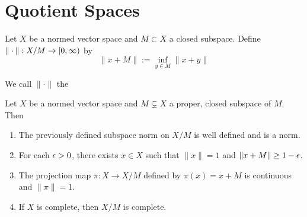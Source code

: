 \documentclass{book}
\begin{document}
	
	
	
	
	
	
	
	
	
	
	
	
	
	
	
	
	
	
	
	
	
	\newpage
	\section{Quotient Spaces}	
	
	\begin{defn} \ld{}
		Let $X$ be a normed vector space and $M \subset X$ a closed subspace. Define $\|\cdot\|:X/M \rightarrow [0,\infty)$ by $$\|x+M\| := \inf_{y \in M}\|x+y\|$$
		
		We call $\|\cdot\|$ the 
	\end{defn}
	
	\begin{ex} \lex{}
		Let $X$ be a normed vector space and $M \subsetneq X$ a proper, closed subspace of $M$. 
		Then 
		\begin{enumerate}
			\item The previously defined subspace norm on $X/M$ is well defined and is a norm. 
			\item For each $\epsilon > 0$, there exists $x \in X$ such that $\|x\|=1$ and $\|x+M\| \geq 1-\epsilon$.
			\item The projection map $\pi:X \rightarrow X/M$ defined by $\pi(x) = x+M$ is continuous and $\|\pi\|=1$. 
			\item If $X$ is complete, then $X/M$ is complete. 
		\end{enumerate} 
	\end{ex}
	
\end{document}

